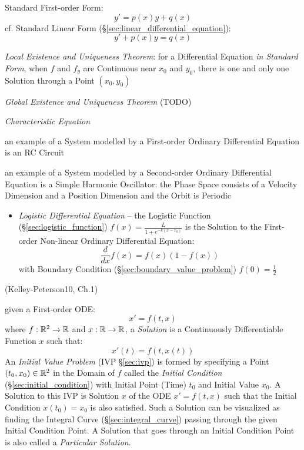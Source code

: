 Standard First-order Form:
\[
  y' = p(x) y + q(x)
\]
cf. Standard Linear Form (\S\ref{sec:linear_differential_equation}):
\[
  y' + p(x) y = q(x)
\]

\emph{Local Existence and Uniqueness Theorem}: for a Differential Equation
\emph{in Standard Form}, when $f$ and $f_y$ are Continuous near $x_0$ and
$y_0$, there is one and only one Solution through a Point $(x_0, y_0)$

\emph{Global Existence and Uniqueness Theorem} (TODO)


\emph{Characteristic Equation}

an example of a System modelled by a First-order Ordinary Differential Equation
is an RC Circuit

an example of a System modelled by a Second-order Ordinary Differential
Equation is a Simple Harmonic Oscillator: the Phase Space consists of a
Velocity Dimension and a Position Dimension and the Orbit is Periodic

\asterism

\begin{itemize}
  \item \emph{Logistic Differential Equation} -- the Logistic Function
    (\S\ref{sec:logistic_function}) $f(x) = \frac{L}{1 + e^{-k(x-x_0)}}$ is the
    Solution to the First-order Non-linear Ordinary Differential Equation:
  \[
    \frac{d}{dx}f(x) = f(x)(1 - f(x))
  \]
  with Boundary Condition (\S\ref{sec:boundary_value_problem}) $f(0) =
  \frac{1}{2}$
\end{itemize}

\asterism

(Kelley-Peterson10, Ch.1)

given a First-order ODE:
\[
  x' = f(t,x)
\]
where $f : \mathbb{R}^2 \rightarrow \mathbb{R}$ and $x : \mathbb{R} \rightarrow \mathbb{R}$, a
\emph{Solution} is a Continuously Differentiable Function $x$ such that:
\[
  x'(t) = f(t, x(t))
\]
An \emph{Initial Value Problem} (IVP \S\ref{sec:ivp}) is formed by specifying a
Point $(t_0, x_0) \in \mathbb{R}^2$ in the Domain of $f$ called the \emph{Initial
  Condition} (\S\ref{sec:initial_condition}) with Initial Point (Time) $t_0$ and
Initial Value $x_0$.
A Solution to this IVP is Solution $x$ of the ODE $x' = f(t,x)$ such that the
Initial Condition $x(t_0) = x_0$ is also satisfied. Such a Solution can be
visualized as finding the Integral Curve (\S\ref{sec:integral_curve}) passing
through the given Initial Condition Point.
A Solution that goes through an Initial Condition Point is also called a
\emph{Particular Solution}.


